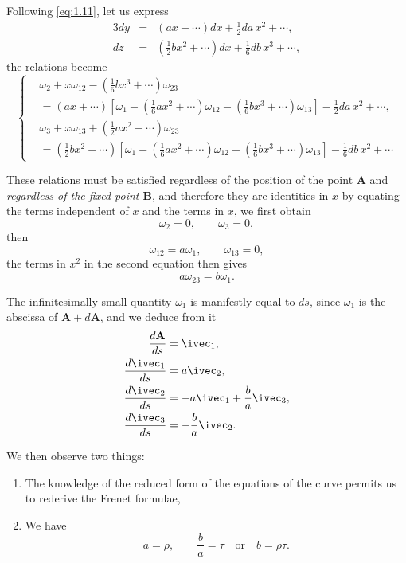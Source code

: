 Following \eqref{eq:1.11}, let us express
\begin{alignat*}{3}
  dy&=&(ax+\cdots)dx+\frac{1}{2}da\,x^{2}+\cdots,\\
  dz&=&{}\left(\frac{1}{2}bx^{2}+\cdots\right)dx+\frac{1}{6}db\,x^{3}+\cdots,
\end{alignat*}
the relations become
\begin{equation}
  \label{eq:1.12}
  \left\{
    \begin{aligned}
      &\omega_{2}+x\omega_{12}-\left(\frac{1}{6}bx^{3}+\cdots\right)\omega_{23}\\
      &=(ax+\cdots)\left[\omega_{1}-\left(\frac{1}{6}ax^{2}+\cdots\right)\omega_{12}-\left(\frac{1}{6}bx^{3}+\cdots\right)\omega_{13}\right]-\frac{1}{2}da\,x^{2}+\cdots,\\
      &\omega_{3}+x\omega_{13}+\left(\frac{1}{2}ax^{2}+\cdots\right)\omega_{23}\\
      &=\left(\frac{1}{2}bx^{2}+\cdots\right)\left[\omega_{1}-\left(\frac{1}{6}ax^{2}+\cdots\right)\omega_{12}-\left(\frac{1}{6}bx^{3}+\cdots\right)\omega_{13}\right]-\frac{1}{6}db\,x^{2}+\cdots
    \end{aligned}
  \right.
\end{equation}

These relations must be satisfied regardless of the position of the point $\mathbf{A}$ and \emph{regardless of the fixed point $\mathbf{B}$}, and therefore they are identities in $x$ by equating the terms independent of $x$ and the terms in $x$, we first obtain
\[
\omega_{2}=0,\qquad\omega_{3}=0,
\]
then
\[
\omega_{12}=a\omega_{1},\qquad\omega_{13}=0,
\]
the terms in $x^{2}$ in the second equation then gives
\[
a\omega_{23}=b\omega_{1}.
\]

The infinitesimally small quantity $\omega_{1}$ is manifestly equal to $ds$, since $\omega_{1}$ is the abscissa of $\mathbf{A}+d\mathbf{A}$, and we deduce from it
\begin{align*}
  \frac{d\mathbf{A}}{ds}&=\ivec_{1},\\
  \frac{d\ivec_{1}}{ds}&=a{\ivec_{2}},\\
  \frac{d\ivec_{2}}{ds}&=-a{\ivec_{1}}+\frac{b}{a}\ivec_{3},\\
  \frac{d\ivec_{3}}{ds}&=-\frac{b}{a}{\ivec_{2}}.
\end{align*}

We then observe two things:
\begin{enumerate}
\item The knowledge of the reduced form of the equations of the curve permits us to rederive the Frenet formulae,
\item We have
\[
a=\rho,\qquad\frac{b}{a}=\tau \quad\text{or}\quad b=\rho\tau.
\]
\end{enumerate}

